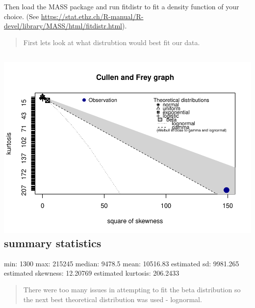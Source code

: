 \documentclass[]{article}
\newenvironment{Shaded}{\begin{snugshade}}{\end{snugshade}}
\newcommand{\KeywordTok}[1]{\textcolor[rgb]{0.13,0.29,0.53}{\textbf{{#1}}}}
\newcommand{\DataTypeTok}[1]{\textcolor[rgb]{0.13,0.29,0.53}{{#1}}}
\newcommand{\StringTok}[1]{\textcolor[rgb]{0.31,0.60,0.02}{{#1}}}
\newcommand{\NormalTok}[1]{{#1}}
\begin{document}
Then load the MASS package and run fitdistr to fit a density function of
your choice. (See
\url{https://stat.ethz.ch/R-manual/R-devel/library/MASS/html/fitdistr.html}).

\begin{quote}
First lets look at what distrubtion would best fit our data.
\end{quote}

\begin{Shaded}
\end{Shaded}

\subsection{\texorpdfstring{\protect\includegraphics{Final_Project_files/figure-latex/unnamed-chunk-11-1.pdf}
summary statistics}{ summary statistics}}\label{summary-statistics}

min: 1300 max: 215245 median: 9478.5 mean: 10516.83 estimated sd:
9981.265 estimated skewness: 12.20769 estimated kurtosis: 206.2433

\begin{quote}
There were too many issues in attempting to fit the beta distribution so
the next best theoretical distribution was used - lognormal.
\end{quote}

\begin{Shaded}
\end{Shaded}
\end{document}
